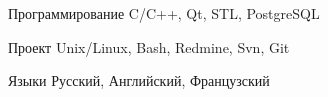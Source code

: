 

\begin{cvskills}

  \cvskill
    {Программирование} %
    {C/C++, Qt, STL, PostgreSQL} %

  \cvskill
    {Проект} %
    {Unix/Linux, Bash, Redmine, Svn, Git} %

  \cvskill
    {Языки} %
    {Русский, Английский, Французский} %

\end{cvskills}

